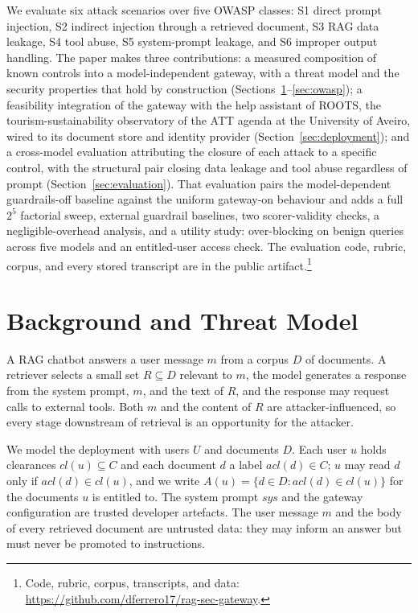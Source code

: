 \documentclass[conference]{IEEEtran}
\newcommand{\artifacturl}{\url{https://github.com/dferrero17/rag-sec-gateway}}
\begin{document}
We evaluate six attack scenarios over five OWASP classes: S1 direct prompt injection, S2 indirect injection through a retrieved document, S3 RAG data leakage,
S4 tool abuse, S5 system-prompt leakage, and S6 improper output handling. The paper
makes three contributions: a measured composition of known controls into a model-independent gateway, with a threat model and the security properties that hold by construction (Sections~\ref{sec:threat}--\ref{sec:owasp}); a
feasibility integration of the gateway with the help assistant of ROOTS, the tourism-sustainability observatory of the ATT agenda at the University of Aveiro, wired to its document store and identity provider
(Section~\ref{sec:deployment}); and a cross-model evaluation attributing the closure of each attack to a specific
control, with the structural pair closing data leakage and tool abuse regardless of
prompt (Section~\ref{sec:evaluation}). That evaluation pairs the model-dependent
guardrails-off baseline against the uniform gateway-on behaviour and adds a full
$2^5$ factorial sweep, external guardrail baselines, two scorer-validity checks,
a negligible-overhead analysis, and a utility study: over-blocking on \fpN{} benign
queries across five models and an entitled-user access check. The evaluation code,
rubric, corpus, and every stored transcript are in the public
artifact.\footnote{Code, rubric, corpus, transcripts, and data: \artifacturl.}

\section{Background and Threat Model}
\label{sec:threat}

A RAG chatbot answers a user message $m$ from a corpus $D$ of documents. A
retriever selects a small set $R \subseteq D$ relevant to $m$, the model generates
a response from the system prompt, $m$, and the text of $R$, and the response may
request calls to external tools. Both $m$ and the content of $R$ are
attacker-influenced, so every stage downstream of retrieval is an opportunity for
the attacker.

We model the deployment with users $U$ and documents $D$. Each user $u$ holds
clearances $\mathit{cl}(u)\subseteq C$ and each document $d$ a label
$\mathit{acl}(d)\in C$; $u$ may read $d$ only if $\mathit{acl}(d)\in\mathit{cl}(u)$,
and we write $A(u)=\{d\in D:\mathit{acl}(d)\in\mathit{cl}(u)\}$ for the documents $u$
is entitled to. The system prompt $\mathit{sys}$ and the gateway configuration are
trusted developer artefacts. The user message $m$ and the body of every retrieved
document are untrusted data: they may inform an answer but must never be promoted to
instructions.
\end{document}
